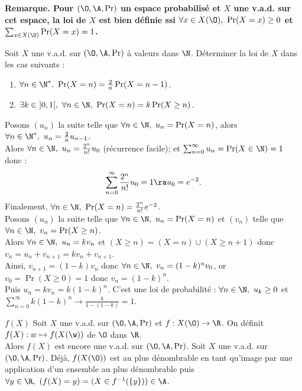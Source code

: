 \documentclass[11pt]{article}
\begin{document}
\bf{Remarque.} Pour $(\O,\A,\Pr)$ un espace probabilisé et $X$ une v.a.d. sur cet espace, la loi de $X$ est bien définie ssi $\forall x \in X(\O), ~ \Pr(X=x)\geq0$ et $\sum_{x\in X(\O)}\Pr(X=x)=1$.

\begin{exercice}{}{}
    Soit $X$ une v.a.d. sur $(\O,\A,\Pr)$ à valeurs dans $\N$. Déterminer la loi de $X$ dans les cas suivants :
    \begin{enumerate}
        \item $\forall n \in \N^*, ~ \Pr(X=n)=\frac{2}{n}\Pr(X=n-1)$.
        \item $\exists k \in ~ ]0,1[, ~ \forall n \in \N, ~ \Pr(X=n)=k\Pr(X\geq n)$.
    \end{enumerate}
    \tcblower
     Posons $(u_n)$ la suite telle que $\forall n \in \N, ~ u_n = \Pr(X=n)$, alors $\forall n \in \N^*, ~ u_n = \frac{2}{n}u_{n-1}$.\\
    Alors $\forall n \in \N, ~ u_n = \frac{2^n}{n!}u_0$ (récurrence facile); et $\sum_{n=0}^\infty u_n = \Pr(X\in\N)=1$ donc :
    \begin{equation*}
        \sum_{n=0}^{\infty}\frac{2^n}{n!}u_0 = 1 \ra u_0 = e^{-2}.
    \end{equation*}
    Finalement, $\forall n \in \N, ~ \Pr(X=n)=\frac{2^n}{n!}e^{-2}$.\\
     Posons $(u_n)$ la suite telle que $\forall n \in \N, ~ u_n=\Pr(X=n)$ et $(v_n)$ telle que $\forall n \in \N, ~ v_n = \Pr(X\geq n)$.\\
    Alors $\forall n \in \N, ~ u_n = kv_n$ et $(X\geq n) = (X = n)\cup(X\geq n+1)$ donc $v_n=u_n + v_{n+1}=kv_n+v_{n+1}$.\\
    Ainsi, $v_{n+1}=(1-k)v_n$ donc $\forall n \in \N, ~ v_n=(1-k)^nv_0$, or $v_0=\Pr(X\geq0)=1$ donc $v_n=(1-k)^n$.\\
    Puis $u_n = kv_n = k(1-k)^n$. C'est une loi de probabilité : $\forall n \in \N, ~ u_k \geq 0$ et $\sum_{n=0}^\infty k(1-k)^n\to\frac{k}{1-(1-k)}=1$.
\end{exercice}

\begin{prop}{$f(X)$}{}
    Soit $X$ une v.a.d. sur $(\O,\A,\Pr)$ et $f:X(\O)\to\R$. On définit $f(X):w\mapsto f(X(\w))$ de $\O$ dans $\R$.\\
    Alors $f(X)$ est encore une v.a.d. sur $(\O,\A,\Pr)$.
    \tcblower
    Soit $X$ une v.a.d. sur $(\O,\A,\Pr)$. Déjà, $f(X(\O))$ est au plus dénombrable en tant qu'image par une application d'un ensemble au plus dénombrable puis $\forall y \in \R, ~ (f(X)=y) = (X \in f^{-1}(\{y\}))\in\A$.
\end{prop}
\end{document}
